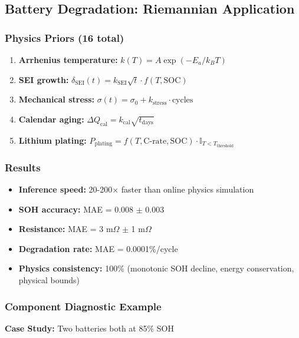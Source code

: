 \documentclass[11pt,a4paper]{article}
\begin{document}
\subsection{Battery Degradation: Riemannian Application}

\subsubsection{Physics Priors (16 total)}

\begin{enumerate}
\item \textbf{Arrhenius temperature:} $k(T) = A\exp(-E_a/k_BT)$
\item \textbf{SEI growth:} $\delta_{\text{SEI}}(t) = k_{\text{SEI}}\sqrt{t} \cdot f(T,\text{SOC})$
\item \textbf{Mechanical stress:} $\sigma(t) = \sigma_0 + k_{\text{stress}} \cdot \text{cycles}$
\item \textbf{Calendar aging:} $\Delta Q_{\text{cal}} = k_{\text{cal}}\sqrt{t_{\text{days}}}$
\item \textbf{Lithium plating:} $P_{\text{plating}} = f(T, \text{C-rate}, \text{SOC}) \cdot \mathbb{I}_{T < T_{\text{threshold}}}$
\end{enumerate}

\subsubsection{Results}

\begin{itemize}
\item \textbf{Inference speed:} 20-200$\times$ faster than online physics simulation
\item \textbf{SOH accuracy:} MAE = 0.008 $\pm$ 0.003
\item \textbf{Resistance:} MAE = 3 m$\Omega$ $\pm$ 1 m$\Omega$
\item \textbf{Degradation rate:} MAE = 0.0001\%/cycle
\item \textbf{Physics consistency:} 100\% (monotonic SOH decline, energy conservation, physical bounds)
\end{itemize}

\subsubsection{Component Diagnostic Example}

\textbf{Case Study:} Two batteries both at 85\% SOH
\end{document}

